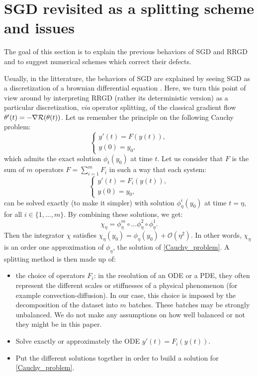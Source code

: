 \section{SGD revisited as a splitting scheme and issues}
\label{section_splitting_schemes}

The goal of this section is to explain the previous behaviors of SGD and RRGD and to suggest numerical schemes which correct their defects. 

Usually, in the litterature, the behaviors of SGD are explained by seeing SGD as a discretization of a brownian differential equation \cite{SDE_comparison,SDE_modified,SDE_edp,malladi_adam,hu2018diffusion,flat_minima_exponential,yang2020fast,sgd_implicit_regularisation,sgd_implicit_regularisation2}. 
Here, we turn this point of view around by interpreting RRGD (rather its deterministic version) as a particular discretization, {\em via} operator splitting, of the classical gradient flow $\theta'(t)=-\nabla \mathcal{R}(\theta(t))$. Let us remember the principle on the following Cauchy problem:
\begin{equation}
	\left\{
	\begin{array}{ll}
		y'(t) = F(y(t)), \\
		y(0) = y_0,
	\end{array}
	\right.
	\label{Cauchy_problem}
\end{equation}
which admits the exact solution $\phi_t(y_0)$ at time $t$. Let us consider that $F$ is the sum of $m$ operators $F=\displaystyle{\sum_{i=1}^m}F_i$ in such a way that each system:
\begin{equation*}
	\left\{
	\begin{array}{ll}
		y'(t) = F_i(y(t)), \\
		y(0) = y_0,
	\end{array}
	\right.
\end{equation*}
can be solved exactly (to make it simpler)  with solution $\phi_{\eta}^i(y_0)$ at time $t=\eta$, for all $i\in \{1,\dots,m\}$. By combining these solutions, we get:
\begin{equation}
	\chi_{\eta} = \phi_{\eta}^m \circ \dots \phi_{\eta}^2 \circ \phi_{\eta}^1.
	\label{splitting_lie_trotter}
\end{equation} 
Then the integrator $\chi$ satisfies $\chi_{\eta}(y_0) = \phi_{\eta}(y_0) + \mathcal{O}(\eta^2)$. In other words, $\chi_{\eta}$ is an order one approximation of $\phi_{\eta}$, the solution of \eqref{Cauchy_problem}. A splitting method is then made up of:
\begin{itemize}
	\item the choice of operators $F_i$: in the resolution of an ODE or a PDE, they often represent the different scales or stiffnesses of a physical phenomenon (for example convection-diffusion). In our case, this choice is imposed by the decomposition of the dataset into $m$ batches. 
          These batches may be strongly unbalanced. We do not make any assumptions on how well balanced or not they might be in this paper.
	\item Solve exactly or approximately the ODE $y'(t)=F_i(y(t))$.
	\item Put the different solutions together in order to build a solution for \eqref{Cauchy_problem}. 
\end{itemize}
